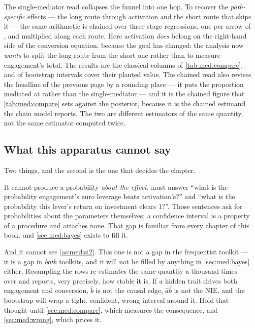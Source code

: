 The single-mediator read collapses the funnel into one hop. To recover the \emph{path-specific}
effects --- the long route through activation and the short route that skips it --- the same
arithmetic is chained over three stage regressions, one per arrow of
, and multiplied along each route. Here activation \emph{does}
belong on the right-hand side of the conversion equation, because the goal has changed: the analysis
now \emph{wants} to split the long route from the short one rather than to measure engagement's
total. The results are the classical columns of \cref{tab:med:compare}, and
\nbFourClNCover{} of \nbFourNEstimands{} bootstrap intervals cover their planted value. The chained
read also revises the headline of the previous page by a rounding place --- it puts the proportion
mediated at \pc{\nbFourClProp} rather than the single-mediator \pc{\nbFourBkProp} --- and it is the
chained figure that \cref{tab:med:compare} sets against the posterior, because it is the chained
estimand the chain model reports. The two are different estimators of the same quantity, not the
same estimator computed twice.

\subsection*{What this apparatus cannot say}

Two things, and the second is the one that decides the chapter.

It cannot produce a probability \emph{about the effect}.  must answer ``what is
the probability engagement's euro leverage beats activation's?'' and ``what is the probability this
lever's return on investment clears 1?''. Those sentences ask for probabilities about the parameters
themselves; a confidence interval is a property of a procedure and attaches none. That gap is
familiar from every chapter of this book, and \cref{sec:med:bayes} exists to fill it.

And it cannot see \cref{as:med:si2}. This one is not a gap in the frequentist toolkit --- it is a
gap in \emph{both} toolkits, and it will not be filled by anything in \cref{sec:med:bayes} either.
Resampling the rows re-estimates the same quantity a thousand times over and reports, very
precisely, how stable it is. If a hidden trait drives both engagement and conversion, $\hat b$ is not
the causal edge, $\hat a \hat b$ is not the NIE, and the bootstrap will wrap a tight, confident,
wrong interval around it. Hold that thought until \cref{sec:med:compare}, which measures the
consequence, and \cref{sec:med:wrong}, which prices it.

